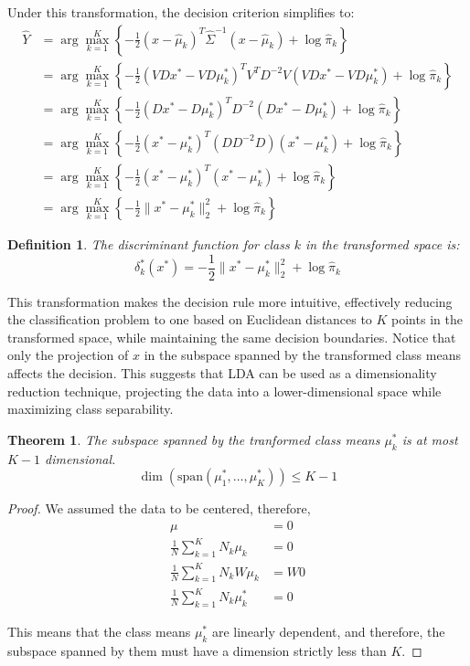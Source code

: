 \documentclass[a4paper,12pt]{article}
\newtheorem{theorem}{Theorem}
\newtheorem{definition}{Definition}
\begin{document}
Under this transformation, the decision criterion simplifies to:
\begin{align*}
\hat{Y} &= \arg\max_{k=1}^K \left\{-\frac{1}{2}(x - \hat{\mu}_k)^T \hat{\Sigma}^{-1} (x - \hat{\mu}_k) + \log \hat{\pi}_k\right\} \\
&= \arg\max_{k=1}^K \left\{-\frac{1}{2}(V D x^* - V D \mu_k^*)^T V^T D^{-2} V (V D x^* - V D \mu_k^*) + \log \hat{\pi}_k\right\} \\
&= \arg\max_{k=1}^K \left\{-\frac{1}{2}(D x^* - D \mu_k^*)^T D^{-2} (D x^* - D \mu_k^*) + \log \hat{\pi}_k\right\} \\
&= \arg\max_{k=1}^K \left\{-\frac{1}{2}(x^* - \mu_k^*)^T (D D^{-2} D) (x^* - \mu_k^*) + \log \hat{\pi}_k\right\} \\
&= \arg\max_{k=1}^K \left\{-\frac{1}{2}(x^* - \mu_k^*)^T (x^* - \mu_k^*) + \log \hat{\pi}_k\right\} \\
&= \arg\max_{k=1}^K \left\{-\frac{1}{2}\|x^* - \mu_k^*\|_2^2 + \log \hat{\pi}_k\right\}
\end{align*}

\begin{definition}
The discriminant function for class $k$ in the transformed space is:
\[
\delta_k^*(x^*) = -\frac{1}{2}\|x^* - \mu_k^*\|_2^2 + \log \hat{\pi}_k
\]
\end{definition}

This transformation makes the decision rule more intuitive, effectively reducing the classification problem to one based on Euclidean distances to $K$ points in the transformed space, while maintaining the same decision boundaries. Notice that only the projection of $x$ in the subspace spanned by the transformed class means affects the decision. This suggests that LDA can be used as a dimensionality reduction technique, projecting the data into a lower-dimensional space while maximizing class separability.

\begin{theorem}
The subspace spanned by the tranformed class means $\mu_k^*$ is at most $K-1$ dimensional.
\[
\dim(\mathrm{span}(\mu_1^*, \ldots, \mu_K^*)) \leq K-1
\]
\end{theorem}

\begin{proof}
We assumed the data to be centered, therefore,
\begin{align*}
\mu &= 0 \\
\frac{1}{N} \sum_{k=1}^K N_k \mu_k &= 0 \\
\frac{1}{N} \sum_{k=1}^K N_k W\mu_k &= W0 \\
\frac{1}{N} \sum_{k=1}^K N_k \mu_k^* & = 0
\end{align*}

This means that the class means $\mu_k^*$ are linearly dependent, and therefore, the subspace spanned by them must have a dimension strictly less than $K$.
\end{proof}
\end{document}
